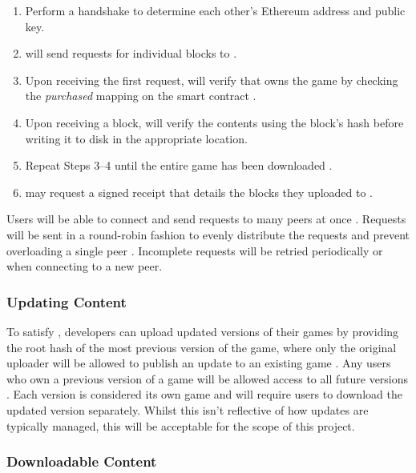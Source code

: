 \begin{enumerate}
  \item Perform a handshake to determine each other's Ethereum address and public key.
  \item \downloader will send requests for individual blocks to \seeder {}.
  \item Upon receiving the first request, \seeder will verify that \downloader owns the game by checking the \textit{purchased} mapping on the smart contract  .
  \item Upon receiving a block, \downloader will verify the contents using the block's hash  before writing it to disk in the appropriate location.
  \item Repeat Steps 3--4 until the entire game has been downloaded .
  \item \seeder may request a signed receipt that details the blocks they uploaded  to \downloader.
\end{enumerate}

\newparagraph
Users will be able to connect and send requests to many peers at once . Requests will be sent in a round-robin fashion to evenly distribute the requests and prevent overloading a single peer . Incomplete requests will be retried periodically or when connecting to a new peer.

\subsubsection*{Updating Content}\label{subsubsec:updating}

To satisfy , developers can upload updated versions of their games by providing the root hash of the most previous version of the game, where only the original uploader will be allowed to publish an update to an existing game . Any users who own a previous version of a game will be allowed access to all future versions .
\x
Each version is considered its own game and will require users to download the updated version separately. Whilst this isn't reflective of how updates are typically managed, this will be acceptable for the scope of this project.

\subsubsection*{Downloadable Content}

